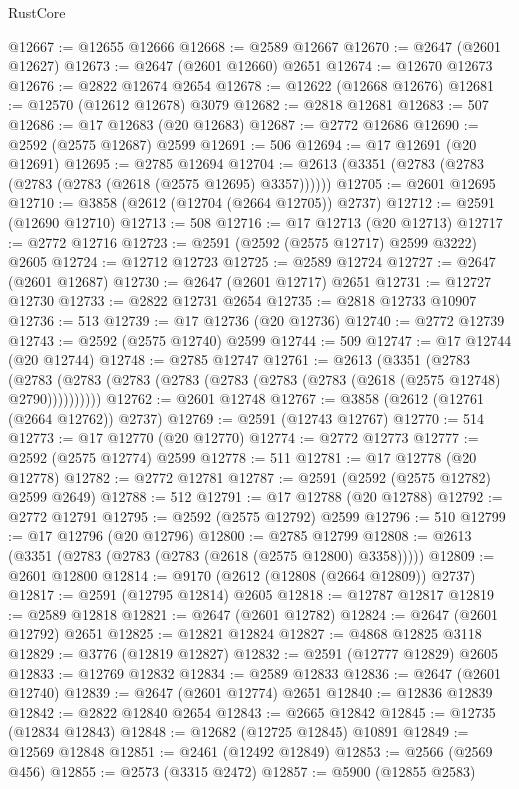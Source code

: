 \begin{lexlean}{RustCore}
\begin{coremodule}
@12667 := @12655 @12666
@12668 := @2589 @12667
@12670 := @2647 (@2601 @12627)
@12673 := @2647 (@2601 @12660) @2651
@12674 := @12670 @12673
@12676 := @2822 @12674 @2654
@12678 := @12622 (@12668 @12676)
@12681 := @12570 (@12612 @12678) @3079
@12682 := @2818 @12681
@12683 := 507
@12686 := @17 @12683 (@20 @12683)
@12687 := @2772 @12686
@12690 := @2592 (@2575 @12687) @2599
@12691 := 506
@12694 := @17 @12691 (@20 @12691)
@12695 := @2785 @12694
@12704 := @2613 (@3351 (@2783 (@2783 (@2783 (@2783 (@2618 (@2575 @12695) @3357))))))
@12705 := @2601 @12695
@12710 := @3858 (@2612 (@12704 (@2664 @12705)) @2737)
@12712 := @2591 (@12690 @12710)
@12713 := 508
@12716 := @17 @12713 (@20 @12713)
@12717 := @2772 @12716
@12723 := @2591 (@2592 (@2575 @12717) @2599 @3222) @2605
@12724 := @12712 @12723
@12725 := @2589 @12724
@12727 := @2647 (@2601 @12687)
@12730 := @2647 (@2601 @12717) @2651
@12731 := @12727 @12730
@12733 := @2822 @12731 @2654
@12735 := @2818 @12733 @10907
@12736 := 513
@12739 := @17 @12736 (@20 @12736)
@12740 := @2772 @12739
@12743 := @2592 (@2575 @12740) @2599
@12744 := 509
@12747 := @17 @12744 (@20 @12744)
@12748 := @2785 @12747
@12761 := @2613
    (@3351
      (@2783 (@2783 (@2783 (@2783 (@2783 (@2783 (@2783 (@2783 (@2618 (@2575 @12748) @2790))))))))))
@12762 := @2601 @12748
@12767 := @3858 (@2612 (@12761 (@2664 @12762)) @2737)
@12769 := @2591 (@12743 @12767)
@12770 := 514
@12773 := @17 @12770 (@20 @12770)
@12774 := @2772 @12773
@12777 := @2592 (@2575 @12774) @2599
@12778 := 511
@12781 := @17 @12778 (@20 @12778)
@12782 := @2772 @12781
@12787 := @2591 (@2592 (@2575 @12782) @2599 @2649)
@12788 := 512
@12791 := @17 @12788 (@20 @12788)
@12792 := @2772 @12791
@12795 := @2592 (@2575 @12792) @2599
@12796 := 510
@12799 := @17 @12796 (@20 @12796)
@12800 := @2785 @12799
@12808 := @2613 (@3351 (@2783 (@2783 (@2783 (@2618 (@2575 @12800) @3358)))))
@12809 := @2601 @12800
@12814 := @9170 (@2612 (@12808 (@2664 @12809)) @2737)
@12817 := @2591 (@12795 @12814) @2605
@12818 := @12787 @12817
@12819 := @2589 @12818
@12821 := @2647 (@2601 @12782)
@12824 := @2647 (@2601 @12792) @2651
@12825 := @12821 @12824
@12827 := @4868 @12825 @3118
@12829 := @3776 (@12819 @12827)
@12832 := @2591 (@12777 @12829) @2605
@12833 := @12769 @12832
@12834 := @2589 @12833
@12836 := @2647 (@2601 @12740)
@12839 := @2647 (@2601 @12774) @2651
@12840 := @12836 @12839
@12842 := @2822 @12840 @2654
@12843 := @2665 @12842
@12845 := @12735 (@12834 @12843)
@12848 := @12682 (@12725 @12845) @10891
@12849 := @12569 @12848
@12851 := @2461 (@12492 @12849)
@12853 := @2566 (@2569 @456)
@12855 := @2573 (@3315 @2472)
@12857 := @5900 (@12855 @2583)

\end{coremodule}
\end{lexlean}
